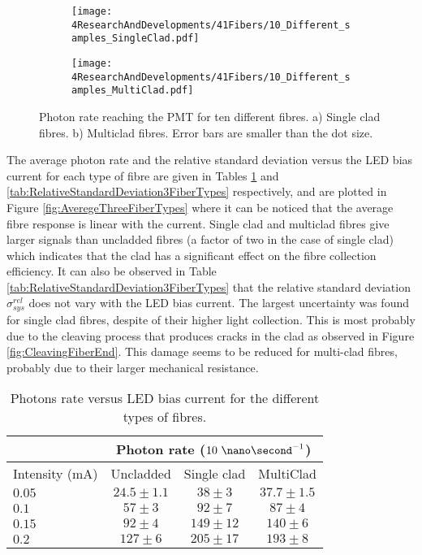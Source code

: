 \begin{figure}
\centering
    \begin{subfigure}[b]{1\textwidth}
    \centering
    \texttt{[image: 4ResearchAndDevelopments/41Fibers/10\_Different\_samples\_SingleClad.pdf]}  
    \caption{\label{subfig:10samplesSC}}
    \end{subfigure}
    \hfill
    \begin{subfigure}[b]{1\textwidth}
    \centering
    \texttt{[image: 4ResearchAndDevelopments/41Fibers/10\_Different\_samples\_MultiClad.pdf]}  
    \caption{\label{subfig:10samplesMC}}
    \end{subfigure}
 \caption{Photon rate reaching the PMT for ten different fibres. a) Single clad fibres. b) Multiclad fibres. Error bars are smaller than the dot size.}
 \label{fig:10samplesThreeTypes}
\end{figure}
The average photon rate and the relative standard deviation versus the LED bias current for each type of fibre are given in Tables \ref{tab:10DifferentSamples} and \ref{tab:RelativeStandardDeviation3FiberTypes} respectively, and are plotted in Figure \ref{fig:AveregeThreeFiberTypes} where it can be noticed that the average fibre response is linear with the current. Single clad and multiclad fibres give larger signals than uncladded fibres (a factor of two in the case of single clad) which indicates that the clad has a significant effect on the fibre collection efficiency. It can also be observed in Table \ref{tab:RelativeStandardDeviation3FiberTypes} that the relative standard deviation $\sigma^{rel}_{sys}$ does not vary with the LED bias current. The largest uncertainty was found for single clad fibres, despite of their higher light collection. This is most probably due to the cleaving process that produces cracks in the clad as observed in Figure \ref{fig:CleavingFiberEnd}. This damage seems to be reduced for multi-clad fibres, probably due to their larger mechanical resistance.

\begin{table}[h]
\centering{}%
\begin{tabular}{lccc}
\toprule 
 & \multicolumn{3}{c}{Photon rate ($10~\nano\second^{-1}$)} \tabularnewline
\midrule
Intensity (mA) & Uncladded & Single clad & MultiClad \tabularnewline
\midrule
\midrule 
$0.05$ & $24.5 \pm 1.1$ & $38 \pm 3$ & $37.7 \pm 1.5$ \tabularnewline
$0.1$ & $57 \pm 3$ & $92 \pm 7$ & $87 \pm 4$ \tabularnewline
$0.15$ & $92 \pm 4$ & $149 \pm 12$ & $140 \pm 6$ \tabularnewline
$0.2$ & $127 \pm 6$ & $205 \pm 17$ & $193 \pm 8$ \tabularnewline
\bottomrule
\end{tabular}
\caption{Photons rate versus LED bias current for the different types of fibres.}
\label{tab:10DifferentSamples}
\end{table}

